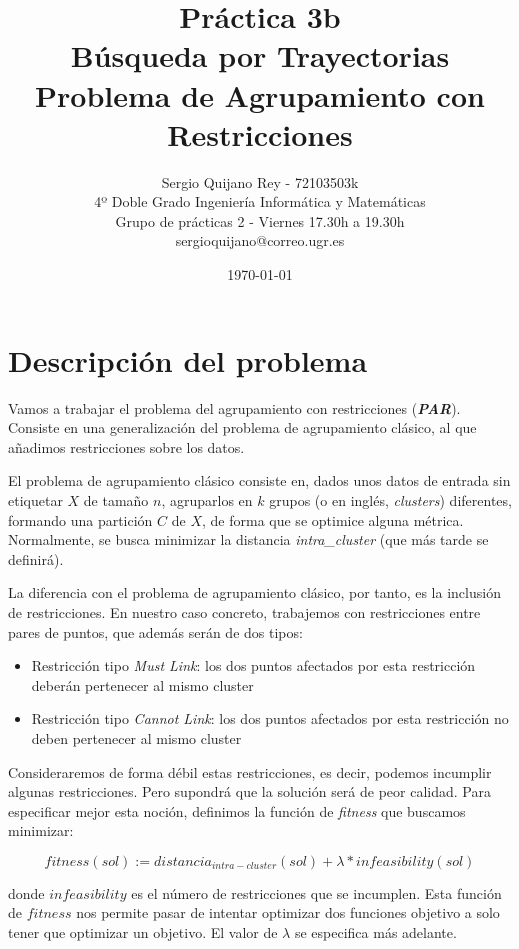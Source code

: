 \documentclass[11pt]{article}
\title{
{Práctica 3b}\\
{Búsqueda por Trayectorias}\\
{Problema de Agrupamiento con Restricciones}\\
}
\author{
{Sergio Quijano Rey - 72103503k}\\
{4º Doble Grado Ingeniería Informática y Matemáticas}\\
{Grupo de prácticas 2 - Viernes 17.30h a 19.30h}\\
{sergioquijano@correo.ugr.es}
}
\date{\today}
\begin{document}
\maketitle
\pagebreak

\tableofcontents

\listoffigures

\pagebreak

\section{Descripción del problema}

Vamos a trabajar el problema del agrupamiento con restricciones (\textbf{\emph{PAR}}). Consiste en una generalización del problema de agrupamiento clásico, al que añadimos restricciones sobre los datos.

El problema de agrupamiento clásico consiste en, dados unos datos de entrada sin etiquetar $X$ de tamaño $n$, agruparlos en $k$ grupos (o en inglés, \emph{clusters}) diferentes, formando una partición $C$ de $X$, de forma que se optimice alguna métrica. Normalmente, se busca minimizar la distancia \emph{intra\_cluster} (que más tarde se definirá).

La diferencia con el problema de agrupamiento clásico, por tanto, es la inclusión de restricciones. En nuestro caso concreto, trabajemos con restricciones entre pares de puntos, que además serán de dos tipos:

\begin{itemize}
\item Restricción tipo \emph{Must Link}: los dos puntos afectados por esta restricción deberán pertenecer al mismo cluster
\item Restricción tipo \emph{Cannot Link}: los dos puntos afectados por esta restricción no deben pertenecer al mismo cluster
\end{itemize}

Consideraremos de forma débil estas restricciones, es decir, podemos incumplir algunas restricciones. Pero supondrá que la solución será de peor calidad. Para especificar mejor esta noción, definimos la función de \emph{fitness} que buscamos minimizar:

\begin{displaymath}
fitness(sol) := distancia_{intra-cluster}(sol) + \lambda * infeasibility(sol)
\end{displaymath}

donde $infeasibility$ es el número de restricciones que se incumplen. Esta función de $fitness$ nos permite pasar de intentar optimizar dos funciones objetivo a solo tener que optimizar un objetivo. El valor de $\lambda$ se especifica más adelante.
\end{document}
